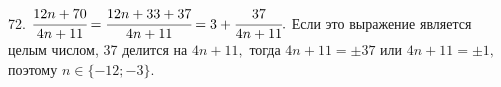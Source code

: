 72. $\cfrac{12n+70}{4n+11}=\cfrac{12n+33+37}{4n+11}=3+\cfrac{37}{4n+11}.$ Если это выражение является целым числом, 37 делится на $4n+11,$ тогда $4n+11=\pm37$ или $4n+11=\pm1,$ поэтому $n\in\{-12;-3\}.$\\
